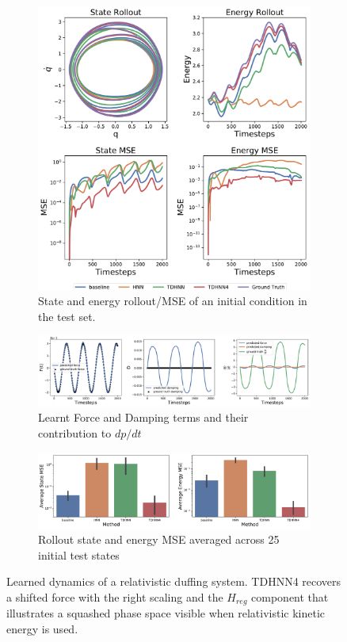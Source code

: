 \documentclass[twoside]{article}
\begin{document}
\begin{figure}[h!]
\centering
\captionsetup{justification=centering}
	\begin{subfigure}[b]{0.4\textwidth}
		\centering
		\includegraphics[width=\textwidth]{figures/relativity_pred.pdf}
		\caption{State and energy rollout/MSE of an initial condition in the test set.}
	\end{subfigure}
	\begin{subfigure}[b]{0.48\textwidth}
		\centering
		\includegraphics[width=\textwidth]{figures/dpdt_relativity.pdf}
		\caption{Learnt Force and Damping terms and their contribution to $dp/dt$}
	\end{subfigure}
	\begin{subfigure}[b]{0.48\textwidth}
	    \centering
		\includegraphics[width=\textwidth]{figures/relativity_errors.pdf}
		\caption{Rollout state and energy MSE averaged across 25 initial test states}
	\end{subfigure}
\caption{Learned dynamics of a relativistic duffing system. TDHNN4 recovers a shifted force with the right scaling and the $H_{reg}$ component that illustrates a squashed phase space visible when relativistic kinetic energy is used.}
\end{figure}
\end{document}
